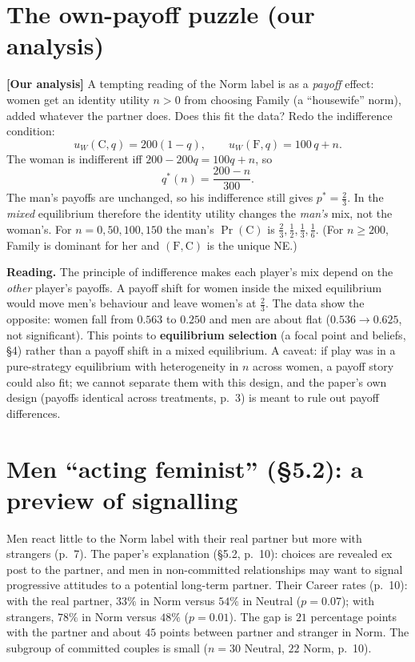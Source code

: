 \documentclass[11pt,a4paper]{article}
\newcommand{\ours}{\textcolor{warn}{\textbf{[Our analysis]}}}
\newcommand{\C}{\mathrm{C}}
\newcommand{\Fm}{\mathrm{F}}
\begin{document}
\section{The own-payoff puzzle (our analysis)}

\ours{} A tempting reading of the Norm label is as a \emph{payoff} effect: women get an identity
utility $n>0$ from choosing Family (a ``housewife'' norm), added whatever the partner does.
Does this fit the data? Redo the indifference condition:
\[
u_W(\C,q)=200(1-q),\qquad u_W(\Fm,q)=100\,q+n .
\]
The woman is indifferent iff $200-200q=100q+n$, so
\[
q^*(n)=\frac{200-n}{300}.
\]
The man's payoffs are unchanged, so his indifference still gives $p^*=\tfrac23$. In the
\emph{mixed} equilibrium therefore the identity utility changes the \emph{man's} mix, not the woman's.
For $n=0,50,100,150$ the man's $\Pr(\C)$ is $\tfrac23,\tfrac12,\tfrac13,\tfrac16$. (For $n\ge200$,
Family is dominant for her and $(\Fm,\C)$ is the unique NE.)

\textbf{Reading.} The principle of indifference makes each player's mix depend on the
\emph{other} player's payoffs. A payoff shift for women inside the mixed equilibrium would move
men's behaviour and leave women's at $\tfrac23$. The data show the opposite: women fall from
$0.563$ to $0.250$ and men are about flat ($0.536\to0.625$, not significant). This points to
\textbf{equilibrium selection} (a focal point and beliefs, \S4) rather than a payoff shift in a
mixed equilibrium. A caveat: if play was in a pure-strategy equilibrium with heterogeneity in $n$
across women, a payoff story could also fit; we cannot separate them with this design, and the
paper's own design (payoffs identical across treatments, p.~3) is meant to rule out payoff
differences.

\section{Men ``acting feminist'' (\S5.2): a preview of signalling}

Men react little to the Norm label with their real partner but more with strangers (p.~7). The
paper's explanation (\S5.2, p.~10): choices are revealed ex post to the partner, and men in
non-committed relationships may want to signal progressive attitudes to a potential long-term
partner. Their Career rates (p.~10): with the real partner, $33\%$ in Norm versus $54\%$ in
Neutral ($p=0.07$); with strangers, $78\%$ in Norm versus $48\%$ ($p=0.01$). The gap is $21$
percentage points with the partner and about $45$ points between partner and stranger in Norm.
The subgroup of committed couples is small ($n=30$ Neutral, $22$ Norm, p.~10).
\end{document}
